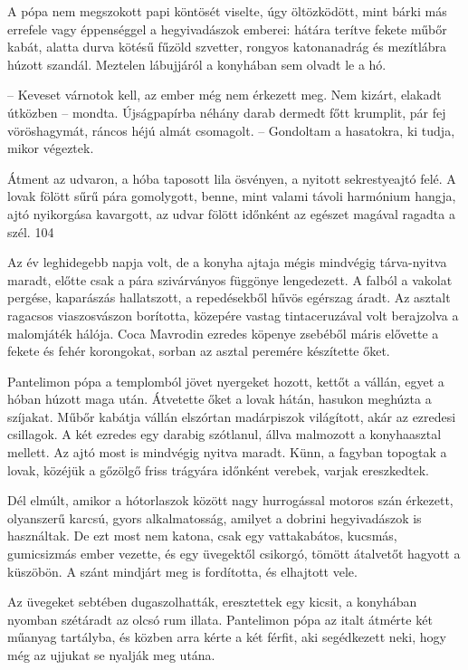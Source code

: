 \documentclass{IEEEtran}
\begin{document}
A pópa nem megszokott papi köntösét viselte, úgy öltözködött, mint bárki más
errefele vagy éppenséggel a hegyivadászok emberei: hátára terítve fekete műbőr
kabát, alatta durva kötésű fűzöld szvetter, rongyos katonanadrág és mezítlábra
húzott szandál. Meztelen lábujjáról a konyhában sem olvadt le a hó.

– Keveset várnotok kell, az ember még nem érkezett meg. Nem kizárt, elakadt
útközben – mondta. Újságpapírba néhány darab dermedt főtt krumplit, pár fej
vöröshagymát, ráncos héjú almát csomagolt. – Gondoltam a hasatokra, ki tudja,
mikor végeztek.

Átment az udvaron, a hóba taposott lila ösvényen, a nyitott sekrestyeajtó
felé. A lovak fölött sűrű pára gomolygott, benne, mint valami távoli harmónium
hangja, ajtó nyikorgása kavargott, az udvar fölött időnként az egészet magával
ragadta a szél.
104

Az év leghidegebb napja volt, de a konyha ajtaja mégis mindvégig tárva-nyitva
maradt, előtte csak a pára szivárványos függönye lengedezett. A falból a
vakolat pergése, kaparászás hallatszott, a repedésekből hűvös egérszag áradt.
Az asztalt ragacsos viaszosvászon borította, közepére vastag tintaceruzával
volt berajzolva a malomjáték hálója. Coca Mavrodin ezredes köpenye zsebéből
máris elővette a fekete és fehér korongokat, sorban az asztal peremére
készítette őket.

Pantelimon pópa a templomból jövet nyergeket hozott, kettőt a vállán, egyet a
hóban húzott maga után. Átvetette őket a lovak hátán, hasukon meghúzta a
szíjakat. Műbőr kabátja vállán elszórtan madárpiszok világított, akár az
ezredesi csillagok. A két ezredes egy darabig szótlanul, állva malmozott a
konyhaasztal mellett. Az ajtó most is mindvégig nyitva maradt. Künn, a fagyban
topogtak a lovak, közéjük a gőzölgő friss trágyára időnként verebek, varjak
ereszkedtek.

Dél elmúlt, amikor a hótorlaszok között nagy hurrogással motoros szán
érkezett, olyanszerű karcsú, gyors alkalmatosság, amilyet a dobrini
hegyivadászok is használtak. De ezt most nem katona, csak egy vattakabátos,
kucsmás, gumicsizmás ember vezette, és egy üvegektől csikorgó, tömött
átalvetőt hagyott a küszöbön. A szánt mindjárt meg is fordította, és elhajtott
vele.

Az üvegeket sebtében dugaszolhatták, eresztettek egy kicsit, a konyhában
nyomban szétáradt az olcsó rum illata. Pantelimon pópa az italt átmérte két
műanyag tartályba, és közben arra kérte a két férfit, aki segédkezett neki,
hogy még az ujjukat se nyalják meg utána.
\end{document}
